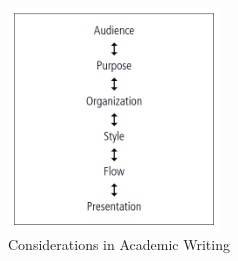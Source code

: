 \begin{figure}[t]
    \centering
   \includegraphics[width=0.5\textwidth]{figures/research/writing_considerations.PNG}
    \caption{Considerations in Academic Writing~\cite{Swales2012}}
    \label{fig:writing_considerations}
\end{figure}

